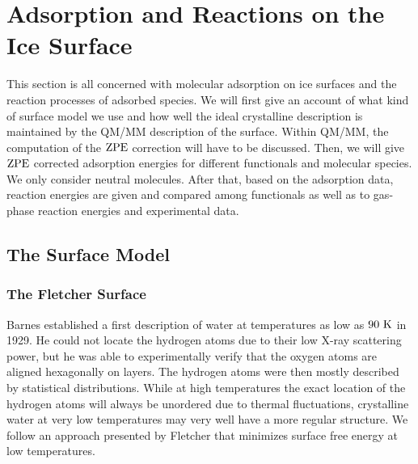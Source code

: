\documentclass[8.5pt,twoside,twocolumn]{article}
\newcommand\zpe{\enmat{\te{ZPE}}}
\renewcommand\K{{\enmat{~\te{K}}}}
\theoremstyle{standard}
\begin{document}
\section{Adsorption and Reactions on the Ice Surface}
\label{Sec:Ads}

This section is all concerned with molecular adsorption on ice surfaces
and the reaction processes of adsorbed species. We will first give an
account of what kind of surface model we use and how well the ideal
crystalline description is maintained by the QM/MM description of
the surface. Within QM/MM, the computation of the $\zpe$ correction 
will have to be discussed. Then, we will give $\zpe$ corrected adsorption
energies for different functionals and molecular species. We only consider
neutral molecules.
After that, based on the adsorption data, reaction energies are given
and compared among functionals as well as to gas-phase reaction
energies and experimental data.

\subsection{The Surface Model}
\label{Sec:Ads:Model}

\subsubsection{The Fletcher Surface}
Barnes \cite{Barnes1929} established a first description of water at
temperatures as low as $90\K$ in 1929. He could not locate the hydrogen atoms
due
to their low X-ray scattering power\cite{Fletcher1966}, but he was able
to experimentally verify that the oxygen atoms are aligned hexagonally
on layers. The hydrogen atoms were then mostly described by statistical
distributions. While at high temperatures the exact location of the hydrogen
atoms will always be unordered due to thermal fluctuations, crystalline
water at very low temperatures may very well have a more regular structure.
We follow an approach presented by Fletcher\cite{Fletcher1992} that minimizes
surface free energy at low temperatures.
\end{document}
